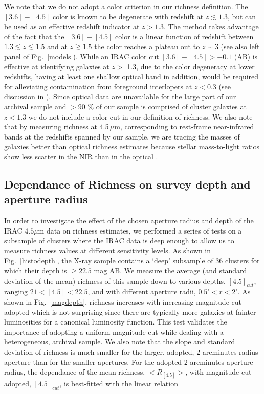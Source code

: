 \documentclass[apj,twocolumn]{emulateapj}
\begin{document}
{We note that we do not adopt a color criterion in our richness definition. The $[3.6]-[4.5]$ color is known to be degenerate with redshift at $z \lesssim 1.3$, but can be used as an effective redshift indicator \citep[e.g.,][]{Papovich08,Muzzin13,Wylezalek13,Rettura14} at $z > 1.3$. The method takes advantage of the fact that the $[3.6]-[4.5]$ color is a linear function of redshift between $1.3 \lesssim z \lesssim 1.5$ and at $z \gtrsim 1.5$ the color reaches a plateau out to $z \sim 3$ (see also left panel of Fig.~\ref{models}). While an IRAC color cut $[3.6]-[4.5] > -0.1$ (AB) is effective at identifying galaxies at $z >$ 1.3, due to the color degeneracy at lower redshifts, having at least one shallow optical band in addition, would be required for alleviating contamination from foreground interlopers at $z <0.3$ (see discussion in \citet{Muzzin13}).
Since optical data are unavailable for the large part of our archival sample and $>90$ \% of our sample is  comprised of cluster galaxies at  $z < 1.3$ we do not include a color cut in our definition of richness. We also note that by measuring richness at 4.5\,$\mu$m, corresponding to rest-frame near-infrared bands at the redshifts spanned by our sample, we are tracing the masses of galaxies
better than optical richness estimates because stellar mass-to-light ratios show less scatter in the NIR than in the optical \citep[e.g.,][]{Bell01}.

\subsection{Dependance of Richness on survey depth and aperture radius}

In order to investigate the effect of the chosen aperture radius and depth of the IRAC $4.5 \mu$m data on richness estimates, we performed a series of tests on a subsample of clusters where the IRAC data is deep enough to allow us to measure richness values at different sensitivity levels. 
As shown in Fig.~\ref{histodepth}, the X-ray sample contains a `deep' subsample of 36 clusters for which their depth is  $\geq 22.5$ mag AB. We measure the average (and standard deviation of the mean) richness of this sample down to various depths, $[4.5]_{cut}$, ranging $21 < [4.5] < 22.5$, and with different aperture radii, $0.5'<r<2'$. As shown in Fig.~\ref{magdepth}, richness increases with increasing magnitude cut adopted which is not surprising since there are typically more galaxies at fainter luminosities for a canonical luminosity function.  This test validates the importance of adopting a uniform magnitude cut while dealing with a heterogeneous, archival sample. We also note that the slope and standard deviation of richness is much smaller for the larger, adopted, 2 arcminutes radius aperture
than for the smaller apertures.
For the adopted  2 arcminutes aperture radius, the dependance of the mean richness, $ < R_{[4.5]} > $, with magnitude cut adopted,  $[4.5]_{cut}$, is best-fitted with the linear relation

}
\end{document}
